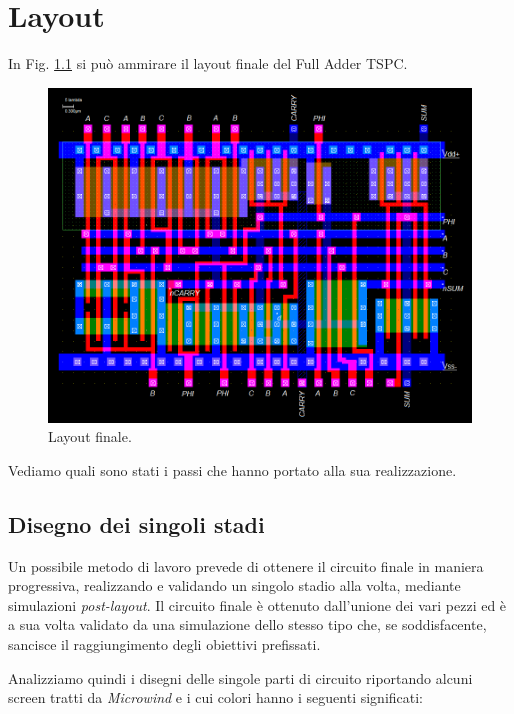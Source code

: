 
\chapter{Layout} %
\label{Chapter4} 

In Fig. \ref{fig:layout} si può ammirare il layout finale del Full Adder TSPC.

\begin{figure}[hbt!]
	\centering
	\includegraphics[width=1\textwidth]{figure/Msk_FullDesign.png}
	\caption{Layout finale.}
	\label{fig:layout}
\end{figure}

Vediamo quali sono stati i passi che hanno portato alla sua realizzazione.

\section{Disegno dei singoli stadi}
\label{sec:sec_disegnoStadi}

Un possibile metodo di lavoro prevede di ottenere il circuito finale in maniera progressiva, realizzando e validando un singolo stadio alla volta, mediante simulazioni \textit{post-layout}. Il circuito finale è ottenuto dall'unione dei vari pezzi ed è a sua volta validato da una simulazione dello stesso tipo che, se soddisfacente, sancisce il raggiungimento degli obiettivi prefissati. 

Analizziamo quindi i disegni delle singole parti di circuito riportando alcuni screen tratti da \textit{Microwind} e i cui colori hanno i seguenti significati:

